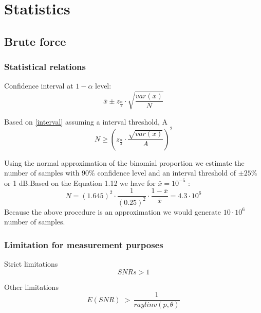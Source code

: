 \chapter{Statistics}

\section{Brute force}
\subsection{Statistical relations}


Confidence interval at $1-\alpha$ level:
\begin{equation}\label{interval}
\bar{x} \pm z_{\frac{\alpha}{2}} \cdot \sqrt{\frac{var(x)}{N}}
\end{equation}

Based on \autoref{interval} assuming a interval threshold, A
\begin{equation}\label{interval2}
N \geq \left(z_{\frac{\alpha}{2}} \cdot \frac{\sqrt{var(x)}}{A} \right)^2
\end{equation}

Using the normal approximation of the binomial proportion we  estimate the number of samples with 90\% confidence level and an interval threshold of $\pm 25\%$ or 1 dB.Based on the Equation 1.12 we have for $ \bar{x} = 10^{-5} $ :
\begin{equation}\label{sampleEQ}
N=(1.645)^{2} \cdot \frac{1}{(0.25)^{2}} \cdot \frac{1-\bar{x}}{\bar{x}} = 4.3 \cdot 10^{6}
\end{equation}
Because the above procedure is an approximation we would generate $ 10 \cdot 10^{6} $ number of samples.\citep{SampleNumURC}
\subsection{Limitation for measurement purposes}

Strict limitations
\begin{equation}
SNRs > 1
\end{equation}

Other limitations
\begin{equation}
E\left(SNR\right) \;>\, \frac{1}{raylinv(p,\theta)} 
\end{equation}

\begin{where}
\end{where}



